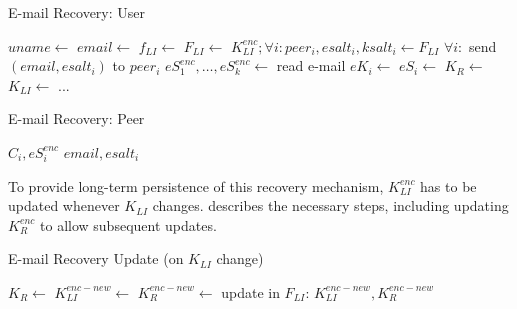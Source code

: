 \begin{algorithm}
\caption{E-mail Recovery: User}
\begin{algorithmic}[\LineNumFrequency]
\State $uname \gets$ 
\State $email \gets$ 
\State $f_{LI} \gets$ 
\State $F_{LI} \gets$ 
\State $K_{LI}^{enc}; \forall i: peer_i, esalt_i, ksalt_i \gets F_{LI}$ 
\State $\forall i:$ send $(email, esalt_i)$ to $peer_i$ 
\State $eS_1^{enc},\dots,eS_k^{enc} \gets$ read e-mail 
  \State $eK_i \gets$ 
  \State $eS_i \gets$ 
\EndFor
\State $K_R \gets$ 
\State $K_{LI} \gets$ 
\State ...
\end{algorithmic}
\end{algorithm}

\begin{algorithm}
\caption{E-mail Recovery: Peer}
\begin{algorithmic}[\LineNumFrequency]
\Stored $C_i, eS_i^{enc}$ 
\Input $email, esalt_i$  %
 
  \State {}
\EndIf
\end{algorithmic}
\end{algorithm}

To provide long-term persistence of this recovery mechanism,
$K_{LI}^{enc}$ has to be updated whenever $K_{LI}$ changes. 
describes the necessary steps, including updating
$K_R^{enc}$ to allow subsequent updates.

\begin{algorithm}
\caption{E-mail Recovery Update (on $K_{LI}$ change)}
\begin{algorithmic}[\LineNumFrequency]
\State $K_R \gets$  
\State $K_{LI}^{enc-new} \gets$ 
\State $K_R^{enc-new} \gets$ 
\State update in $F_{LI}$: $K_{LI}^{enc-new}, K_R^{enc-new}$ 
\end{algorithmic}
\end{algorithm}





